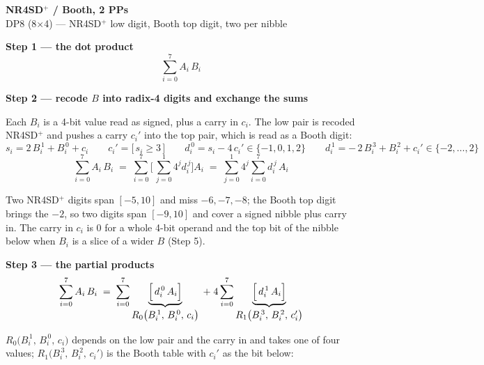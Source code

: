 \documentclass[fleqn]{article}
\newcommand{\Rl}{R_0\bigl(B_i^{\,1},\, B_i^{\,0},\, c_i\bigr)}
\newcommand{\Rh}{R_1\bigl(B_i^{\,3},\, B_i^{\,2},\, c_i'\bigr)}
\begin{document}
\begin{center}
{\LARGE \textbf{NR4SD$^{+}$ / Booth, 2 PPs}}\\[4pt]
{\large DP8 (8$\times$4) --- NR4SD$^{+}$ low digit, Booth top digit, two per nibble}
\end{center}

\vspace{1.5em}

\noindent\textbf{Step 1 --- the dot product}
\[
\sum_{i=0}^{7} A_i \, B_i
\]

\vspace{0.5em}

\noindent\textbf{Step 2 --- recode $B$ into radix-4 digits and exchange the sums}

\noindent Each $B_i$ is a 4-bit value read as signed, plus a carry in $c_i$. The low pair is
recoded NR4SD$^{+}$ and pushes a carry $c_i'$ into the top pair, which is read as a Booth
digit:
\[
s_i = 2\,B_i^{\,1} + B_i^{\,0} + c_i
\qquad
c_i' = \bigl[\, s_i \geq 3 \,\bigr]
\qquad
d_i^{\,0} = s_i - 4\,c_i' \in \{-1, 0, 1, 2\}
\qquad
d_i^{\,1} = -\,2\,B_i^{\,3} + B_i^{\,2} + c_i' \in \{-2,\dots,2\}
\]
\[
\sum_{i=0}^{7} A_i \, B_i
  \;=\; \sum_{i=0}^{7} \Biggl[\, \sum_{j=0}^{1} 4^{j} d_i^{\,j} \Biggr] A_i
  \;=\; \sum_{j=0}^{1} 4^{j} \sum_{i=0}^{7} d_i^{\,j} \, A_i
\]

\noindent Two NR4SD$^{+}$ digits span $[-5, 10]$ and miss $-6, -7, -8$; the Booth top digit
brings the $-2$, so two digits span $[-9, 10]$ and cover a signed nibble plus carry in.
The carry in $c_i$ is $0$ for a whole 4-bit operand and the top bit of the nibble below
when $B_i$ is a slice of a wider $B$ (Step 5).

\vspace{0.5em}

\noindent\textbf{Step 3 --- the partial products}
\[
\sum_{i=0}^{7} A_i \, B_i
  \;=\; \sum_{i=0}^{7}
        \underbrace{\Bigl[\, d_i^{\,0} \, A_i \Bigr]}_{\textstyle \Rl}
  \;+\; 4 \sum_{i=0}^{7}
        \underbrace{\Bigl[\, d_i^{\,1} \, A_i \Bigr]}_{\textstyle \Rh}
\]

\noindent $\Rl$ depends on the low pair and the carry in and takes one of four values;
$\Rh$ is the Booth table with $c_i'$ as the bit below:

\vspace{0.5em}
\end{document}
